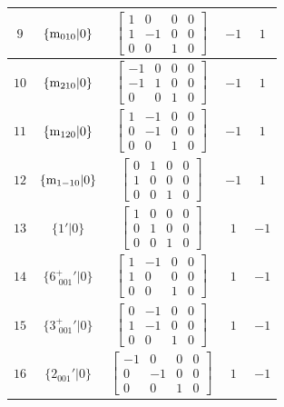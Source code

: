 \documentclass[fleqn,8pt]{jsarticle}
\begin{document}
\begin{longtable}{ccccc}
$ 9 $ & $ \{{\rm m}_{010}|0\} $ & $ \begin{bmatrix} 1 & 0 & 0 & 0 \\ 1 & -1 & 0 & 0 \\ 0 & 0 & 1 & 0 \end{bmatrix} $ & $ -1 $ & $ 1 $ \\ \hline
$ 10 $ & $ \{{\rm m}_{210}|0\} $ & $ \begin{bmatrix} -1 & 0 & 0 & 0 \\ -1 & 1 & 0 & 0 \\ 0 & 0 & 1 & 0 \end{bmatrix} $ & $ -1 $ & $ 1 $ \\ \hline
$ 11 $ & $ \{{\rm m}_{120}|0\} $ & $ \begin{bmatrix} 1 & -1 & 0 & 0 \\ 0 & -1 & 0 & 0 \\ 0 & 0 & 1 & 0 \end{bmatrix} $ & $ -1 $ & $ 1 $ \\ \hline
$ 12 $ & $ \{{\rm m}_{1-10}|0\} $ & $ \begin{bmatrix} 0 & 1 & 0 & 0 \\ 1 & 0 & 0 & 0 \\ 0 & 0 & 1 & 0 \end{bmatrix} $ & $ -1 $ & $ 1 $ \\ \hline
$ 13 $ & $ \{1{}'|0\} $ & $ \begin{bmatrix} 1 & 0 & 0 & 0 \\ 0 & 1 & 0 & 0 \\ 0 & 0 & 1 & 0 \end{bmatrix} $ & $ 1 $ & $ -1 $ \\ \hline
$ 14 $ & $ \{6^{+}_{\,\,001}{}'|0\} $ & $ \begin{bmatrix} 1 & -1 & 0 & 0 \\ 1 & 0 & 0 & 0 \\ 0 & 0 & 1 & 0 \end{bmatrix} $ & $ 1 $ & $ -1 $ \\ \hline
$ 15 $ & $ \{3^{+}_{\,\,001}{}'|0\} $ & $ \begin{bmatrix} 0 & -1 & 0 & 0 \\ 1 & -1 & 0 & 0 \\ 0 & 0 & 1 & 0 \end{bmatrix} $ & $ 1 $ & $ -1 $ \\ \hline
$ 16 $ & $ \{2{}_{001}{}'|0\} $ & $ \begin{bmatrix} -1 & 0 & 0 & 0 \\ 0 & -1 & 0 & 0 \\ 0 & 0 & 1 & 0 \end{bmatrix} $ & $ 1 $ & $ -1 $ \\ \hline

\end{longtable}
\end{document}
